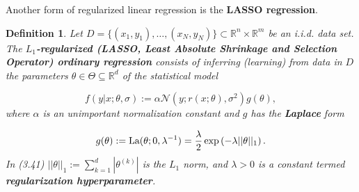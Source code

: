 \documentclass{report}
\newtheorem{definition}{Definition}[chapter]
\begin{document}
Another form of regularized linear regression is the \textbf{LASSO regression}.

\begin{definition}
Let $D = \{(x_1,y_1),\dots,(x_N,y_N)\} \subset \mathbb{R}^n \times \mathbb{R}^m$ be an i.i.d. data set. The \textbf{$L_1$-regularized (LASSO, Least Absolute Shrinkage and Selection Operator) ordinary regression} consists of inferring (learning) from data in $D$ the parameters $\theta \in \Theta \subseteq \mathbb{R}^d$ of the statistical model

\begin{equation}
f(y|x;\theta,\sigma) := \alpha\mathcal{N}(y;r(x;\theta),\sigma^2)g(\theta),
\end{equation}
where $\alpha$ is an unimportant normalization constant and $g$ has the \textbf{Laplace} form

\begin{equation}
g(\theta) := \textup{La}(\theta;0,\lambda^{-1}) = \frac{\lambda}{2}\exp\left(-\lambda||\theta||_1\right).
\end{equation}
In (3.41) $||\theta||_1 := \sum_{k=1}^d |\theta^{(k)}|$ is the $L_1$ norm, and $\lambda > 0$ is a constant termed \textbf{regularization hyperparameter}.
\end{definition}
\end{document}
